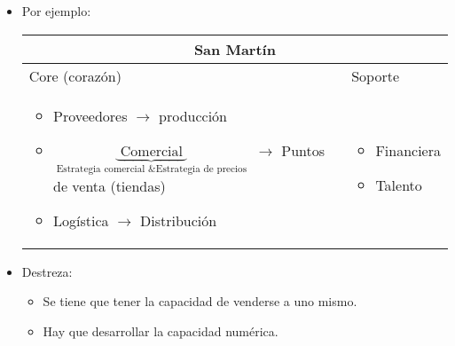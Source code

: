 \begin{itemize}
    \item Por ejemplo:
        \begin{center}
           \begin{tabular}{ | p{5cm} | p{5cm} | }
               \hline
                    \multicolumn{2}{|c|}{San Martín} \\
               \hline
                    Core (corazón) & Soporte \\ 
               \hline
                    \begin{itemize}
                        \item Proveedores $\rightarrow$ producción 
                        \item $\underbrace{\text{  Comercial  } }_{\text{  Estrategia comercial \& Estrategia de precios  }}$ $\rightarrow$ Puntos de venta (tiendas)
                        \item Logística $\rightarrow$ Distribución
                    \end{itemize} &
                    \begin{itemize}
                        \item Financiera 
                        \item Talento 
                    \end{itemize} \\ 
                \hline
           \end{tabular}
        \end{center}
    
    \item Destreza:
        \begin{itemize}[label=\#]
            \item Se tiene que tener la capacidad de venderse a uno mismo.
            \item Hay que desarrollar la capacidad numérica.
        \end{itemize}
\end{itemize}




